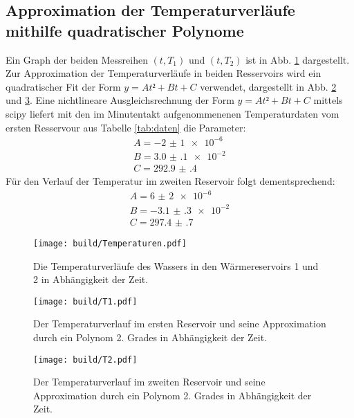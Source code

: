 \subsection{Approximation der Temperaturverläufe mithilfe quadratischer Polynome}
Ein Graph der beiden Messreihen $(t,T_1)$ und $(t,T_2)$ ist in Abb. \ref{fig:Graph2} dargestellt.
 Zur Approximation der Temperaturverläufe in beiden Resservoirs wird ein
 quadratischer Fit der Form $y = At²+Bt+C$ verwendet, dargestellt in Abb. \ref{fig:Graph3} und \ref{fig:Graph4}. Eine nichtlineare
 Ausgleichsrechnung der Form $y = At²+Bt+C$ mittels scipy \cite{scipy} liefert mit den im Minutentakt
 aufgenommenenen Temperaturdaten vom ersten Resservour aus Tabelle \ref{tab:daten}
 die Parameter:
 \begin{displaymath}
\begin{aligned}
 A = \num{-2(1)e-6}\\
 B = \num{3.0(1)e-2}\\
 C = \num{292.9(4)}
 \end{aligned}
 \end{displaymath}
 Für den Verlauf der Temperatur im zweiten Reservoir folgt dementsprechend:
 \begin{displaymath}
\begin{aligned}
 A = \num{6(2)e-6}\\
 B = \num{-3.1(3)e-2}\\
 C = \num{297.4(7)}
 \end{aligned}
 \end{displaymath}
 \begin{figure}
 	\centering
 	\caption{Die Temperaturverläufe des Wassers in den Wärmereservoirs 1 und 2 in Abhängigkeit der Zeit.}
 	\texttt{[image: build/Temperaturen.pdf]}
 	\label{fig:Graph2}
 \end{figure}
 \begin{figure}
 	\centering
 	\caption{Der Temperaturverlauf im ersten Reservoir und seine Approximation durch ein Polynom 2. Grades in Abhängigkeit der Zeit.}
 	\texttt{[image: build/T1.pdf]}
 	\label{fig:Graph3}
 \end{figure}
 \begin{figure}
 	\centering
 	\caption{Der Temperaturverlauf im zweiten Reservoir und seine Approximation durch ein Polynom 2. Grades in Abhängigkeit der Zeit.}
 	\texttt{[image: build/T2.pdf]}
 	\label{fig:Graph4}
 \end{figure}


